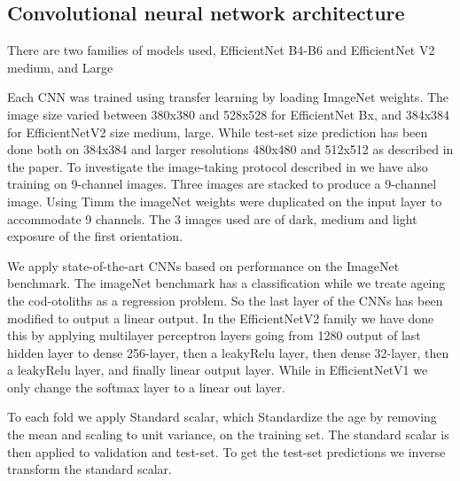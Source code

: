 \documentclass[10pt,letterpaper]{article}
\begin{document}
\subsection*{Convolutional neural network architecture}

There are two families of models used, EfficientNet B4-B6 \citep{DBLP:journals/corr/abs-1905-11946}  and EfficientNet V2 medium, and Large \citep{DBLP:journals/corr/abs-1905-11946} 

Each CNN was trained using transfer learning by loading ImageNet \citep{deng2009imagenet} weights. The image size varied between 380x380 and 528x528 for EfficientNet Bx, and 384x384 for EfficientNetV2 size medium, large. While test-set size prediction has been done both on 384x384 and larger resolutions 480x480 and 512x512 as described in the paper. To investigate the image-taking protocol described in \citep{codOtolithsMyers} we have also training on 9-channel images. Three images are stacked to produce a 9-channel image. Using Timm\citep{rw2019timm} the imageNet weights were duplicated on the input layer to accommodate 9 channels. The 3 images used are of dark, medium and light exposure of the first orientation.

We apply state-of-the-art CNNs based on performance on the ImageNet benchmark. The imageNet benchmark has a classification while we treate ageing the cod-otoliths as a regression problem. So the last layer of the CNNs has been modified to output a linear output. In the EfficientNetV2 family we have done this by applying multilayer perceptron layers going from 1280 output of last hidden layer to dense 256-layer, then a leakyRelu \citep{DBLP:journals/corr/XuWCL15} layer, then dense 32-layer, then a leakyRelu layer, and finally linear output layer. While in EfficientNetV1 we only change the softmax layer to a linear out layer.

To each fold we apply Standard scalar, which Standardize the age by removing the mean and scaling to unit variance, on the training set. The standard scalar is then applied to validation and test-set. To get the test-set predictions we inverse transform the standard scalar.
\end{document}
